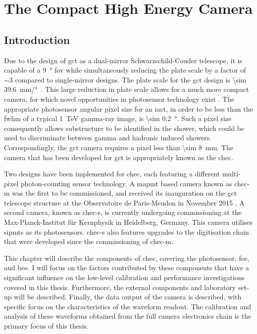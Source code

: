 \chapter{\label{ch2-mechanics} The Compact High Energy Camera}

\minitoc

\section{Introduction}

Due to the design of \gls{gct} as a dual-mirror Schwarzschild-Couder telescope, it is capable of a \SI{9}{\degree} \gls{fov} while simultaneously reducing the plate scale by a factor of ${\sim} 3$ compared to single-mirror designs. The plate scale for the \gls{gct} design is \SI{\sim 39.6}{mm/\degree}~\cite{Rulten2016}. This large reduction in plate scale allows for a much more compact camera, for which novel opportunities in photosensor technology exist \cite{Vassiliev2007}. The appropriate photosensor angular pixel size for an \mbox{\gls{iact}}, in order to be less than the \gls{fwhm} of a typical \SI{1}{TeV} gamma-ray image, is \SI{\sim 0.2}{\degree}. Such a pixel size consequently allows substructure to be identified in the shower, which could be used to discriminate between gamma and hadronic induced showers. Correspondingly, the \gls{gct} camera requires a pixel less than \SI{\sim 8}{mm}. The camera that has been developed for \gls{gct} is appropriately known as the \gls{chec}.

Two designs have been implemented for \gls{chec}, each featuring a different multi-pixel photon-counting sensor technology. A \gls{mapmt} based camera known as \gls{chec-m} was the first to be commissioned, and received its inauguration on the \gls{gct} telescope structure at the Observatoire de Paris-Meudon in November 2015 \cite{Watson2017}. A second camera, known as \gls{chec-s}, is currently undergoing commissioning at the Max-Planck-Institut für Kernphysik in Heidelberg, Germany. This camera utilises \glspl{sipmt} as its photosensors. \gls{chec-s} also features upgrades to the digitisation chain that were developed since the commissioning of \gls{chec-m}.

This chapter will describe the components of \gls{chec}, covering the photosensor, \gls{fee}, and \gls{bee}. I will focus on the factors contributed by these components that have a significant influence on the low-level calibration and performance investigations covered in this thesis. Furthermore, the external components and laboratory set-up will be described. Finally, the data output of the camera is described, with specific focus on the characteristics of the waveform readout. The calibration and analysis of these waveforms obtained from the full camera electronics chain is the primary focus of this thesis.

